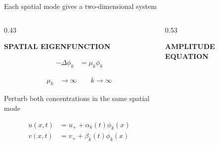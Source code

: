 \begin{frame}{Each spatial mode gives a two-dimensional system}

  \vspace{-0.24cm}

  \begin{columns}[T,onlytextwidth]

    \begin{column}{0.43\textwidth}

      {\centering
        \color{HydraGold}\bfseries\fontsize{7.6}{9.1}\selectfont
        SPATIAL EIGENFUNCTION\par
      }

      \vspace{-0.62cm}

      {\color{HydraWhite}\fontsize{9.6}{12.1}\selectfont
      \begin{align*}
        -\Delta\phi_k
        &=
        \mu_k\phi_k
      \end{align*}
      }

      \vspace{-1.02cm}

      {\color{HydraMuted}\fontsize{8.0}{10.1}\selectfont
      \begin{align*}
        \mu_k
        &\longrightarrow
        \infty
        \qquad
        k\longrightarrow\infty
      \end{align*}
      }

      \vspace{-0.42cm}

      {\color{HydraMuted}\fontsize{7.5}{9.2}\selectfont
        Perturb both concentrations in the same spatial mode
      \par}

      \vspace{-0.28cm}

      {\color{HydraWhite}\fontsize{8.8}{11.2}\selectfont
      \begin{align*}
        u(x,t)
        &=
        u_++\alpha_k(t)\phi_k(x)
        \\
        v(x,t)
        &=
        v_++\beta_k(t)\phi_k(x)
      \end{align*}
      }

    \end{column}

    \begin{column}{0.53\textwidth}
      \vspace{1.0cm}
      {\centering
        \color{HydraCyan}\bfseries\fontsize{7.6}{9.1}\selectfont
        AMPLITUDE EQUATION\par
      }


\end{column}
\end{columns}
\end{frame}
